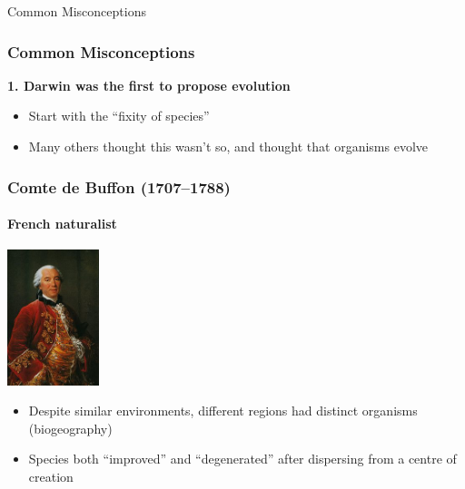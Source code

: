 \documentclass[10pt]{beamer}
\begin{document}
\begin{frame}
	\begin{center}
		\textcolor{myblue}{\LARGE{Common Misconceptions}}
	\end{center}	
\end{frame}


\begin{frame}[t]
\frametitle{Common Misconceptions}
\vspace{0.5cm}
	
	\textbf{\textcolor{myblue}{1.} Darwin was the first to propose evolution}
	
	\medskip
	
	\begin{itemize}
		\item Start with the ``fixity of species''
		\medskip
		\item Many others thought this wasn't so, and thought that organisms evolve
	\end{itemize}
\end{frame}


\begin{frame}[t]
\frametitle{Comte de Buffon (1707--1788)}
\framesubtitle{French naturalist}
	
	\begin{center}
		\includegraphics[width=0.20\textwidth]{figures/buffon.jpg}\\
	\end{center}
	
	\vspace{0.25cm}
	
	\begin{itemize}
		\item Despite similar environments, different regions had distinct organisms (biogeography)
		\medskip
		\item Species both ``improved'' and ``degenerated'' after dispersing from a centre of creation
	\end{itemize}
\end{frame}
\end{document}
